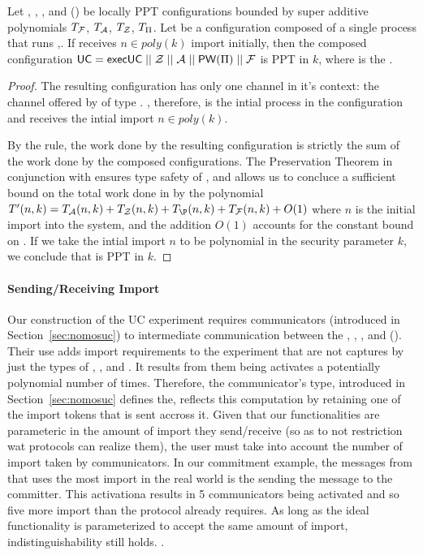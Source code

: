\begin{theorem} \label{thm:soundness}
Let \F, \A, \Z, and (\PI) be locally PPT configurations bounded by super additive polynomials $T_\mathcal{F}$, $T_\mathcal{A}$, $T_\mathcal{Z}$, $T_\Pi$. Let  be a configuration composed of a single process that runs ,. If  receives $n \in poly(k)$ import initially, then the composed configuration $\mathsf{UC} = \mathsf{execUC} \; || \; \mathcal{Z} \; || \; \mathcal{A} \; || \; \mathsf{PW}(\Pi) \; || \; \mathcal{F}$ is PPT in $k$, where  is the \partywrapper.
\end{theorem}

\begin{proof}
The resulting configuration  has only one channel in it's context: the channel offered by  of type . 
, therefore, is the intial process in the configuration and receives the intial import $n \in poly(k)$.

By the  rule, the work done by the resulting configuration is strictly the sum of the work done by the composed configurations. 
The Preservation Theorem in conjunction with  ensures type safety of , and allows us to concluce a sufficient bound on the total work done in  by the polynomial $T'(n,k) = T_\A(n,k) + T_\Z(n,k) + T_\P(n,k) + T_\F(n,k) + O(1)$ where $n$ is the initial import into the system, and the addition $O(1)$ accounts for the constant bound on .
If we take the intial import $n$ to be polynomial in the security parameter $k$, we conclude that  is PPT in $k$.
\end{proof}

\paragraph{Sending/Receiving Import}
Our construction of the UC experiment requires communicators (introduced in Section~\ref{sec:nomosuc}) to intermediate communication between the \Z, \A, \F, and (\PI).
Their use adds import requirements to the experiment that are not captures by just the types of \F, \A, and \PI. 
It results from them being activates a potentially polynomial number of times. Therefore, the communicator's type, introduced in Section~\ref{sec:nomosuc} defines the, reflects this computation by
retaining one of the import tokens that is sent accross it. 
Given that our functionalities are parameteric in the amount of import they send/receive (so as to not restriction wat protocols can realize them), the user must take into account the number of import taken by communicators.
In our commitment example, the messages from \Z that uses the most import in the real world is the sending the  message to the committer. This activationa results in 5 communicators being activated and so five more import than the protocol already requires. As long as the ideal functionality is parameterized to accept the same amount of import, indistinguishability still holds. .

